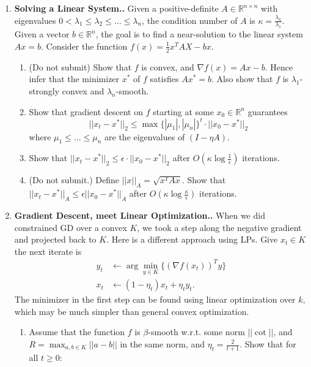 \documentclass{article}
\theoremstyle{plain}
\newcommand{\R}{\mathbb{R}}
\newcommand\litem[1]{\item{\bfseries#1.\space}}
\begin{document}
\begin{enumerate}
\begin{enumerate}
        Note: This idea was used in the Christiano et al. paper,
        combined with electrical flows, to bring the width down to
        $O(\sqrt{m/\epsilon})$.
      \end{enumerate}
      \litem{Solving a Linear System.} Given a positive-definite $A \in \R^{n \times n}$ with eigenvalues $0 < \lambda_1 \leq \lambda_2 \leq \ldots \leq \lambda_n$, the condition number of $A$ is $\kappa = \frac{\lambda_n}{\lambda_1}$. Given a vector $b\in \R^n$, the goal is to find a near-solution to the linear system $Ax = b$. Consider the function $f(x) = \frac{1}{2} x ^T A X - bx$.
      \begin{enumerate}
      \item (Do not submit) Show that $f$ is convex, and $\nabla f(x) = Ax - b$. Hence infer that the minimizer $x^*$ of $f$ satisfies $A x^* = b$.  Also show that $f$ is $\lambda_1$-strongly convex and $\lambda_n$-smooth.
      \item Show that gradient descent on $f$ starting at some $x_0 \in \R^n$ guarantees
        \[ || x_t - x^*||_2 \leq \max\{|\mu_1|, |\mu_n |\}^t \cdot || x_0 - x^*||_2\]
        where $\mu_1 \leq \ldots \leq \mu_n$ are the eigenvalues of $(I - \eta A)$.
      \item Show that $||x_t - x^*||_2 \leq \epsilon \cdot || x_0 - x^*||_2 $ after $O(\kappa \log \frac{1}{\epsilon})$ iterations.
      \item (Do not submit.) Define $||x||_A = \sqrt{x^T A x}$. Show
        that $|| x_t - x^*||_A \leq \epsilon || x_0- x^*||_A$ after
        $O(\kappa \log\frac{\kappa}{\epsilon})$ iterations.
      \end{enumerate}
      \litem{Gradient Descent, meet Linear Optimization.} When we did
      constrained GD over a convex $K$, we took a step along the
      negative gradient and projected back to $K$. Here is a different
      approach using LPs. Give $x_t \in K$ the next iterate is
      \begin{align*}
        y_t & \gets \arg\min_{y \in K}\{(\nabla f  (x_t))^T y\} \\
        x_t & \gets (1-\eta_t) x_t + \eta_t y_t.              
      \end{align*}
      The minimizer in the first step can be found using linear optimization over $k$, which may be much simpler than general convex optimization.
      \begin{enumerate}
      \item Assume that the function $f$ is $\beta$-smooth w.r.t. some norm $|| \cot ||$, and $R = \max_{a,b \in K} || a - b||$ in the same norm, and $\eta_t = \frac{2}{t+1}$. Show that for all $t\geq 0$:

\end{enumerate}
\end{enumerate}
\end{document}
